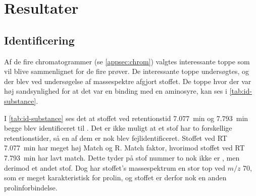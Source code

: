 \section{Resultater}
\subsection{Identificering}
Af de fire chromatogrammer (se \cref{appsec:chrom}) valgtes interessante toppe som vil blive sammenlignet for de fire prøver.
De interessante toppe undersøgtes, og der blev ved undersøgelse af massespektre afgjort stoffet.
De toppe hvor der var høj sandsynlighed for at det var en binding med en aminosyre, kan ses i \cref{tab:id-substance}.

\par I \cref{tab:id-substance} ses det at stoffet ved retentionstid \qty{7.077}{\minute} og \qty{7.793}{\minute} begge blev identificeret til .
Det er ikke muligt at et stof har to forskellige retentionstider, så en af dem er nok blev fejlidentificeret.
Stoffet ved RT \qty{7.077}{\minute} har meget høj Match og R. Match faktor, hvorimod stoffet ved RT \qty{7.793}{\minute} har lavt match.
Dette tyder på stof nummer to nok ikke er , men derimod et andet stof.
Dog har stoffet's massespektrum en stor top ved $m/z$ \num{70}, som er meget karakteristisk for prolin, og stoffet er derfor nok en anden prolinforbindelse.
